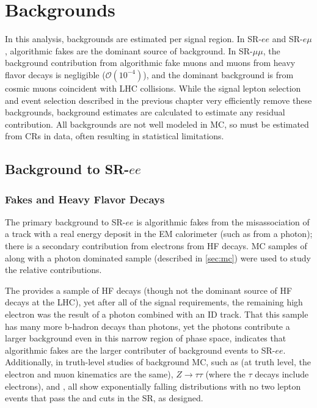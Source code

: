 \chapter{Backgrounds}
\label{chap:backgrounds}

In this analysis, backgrounds are estimated per signal region. In SR-$ee$ and SR-$e\mu$, algorithmic fakes are the dominant source of background. In SR-$\mu\mu$, the background contribution from algorithmic fake muons and muons from heavy flavor decays is negligible ($\mathcal{O}(10^{-4})$), and the dominant background is from cosmic muons coincident with \ac{LHC} collisions. While the signal lepton selection and event selection described in the previous chapter very efficiently remove these backgrounds, background estimates are calculated to estimate any residual contribution. All backgrounds are not well modeled in \ac{MC}, so must be estimated from \acp{CR} in data, often resulting in statistical limitations.

\section{Background to SR-$ee$}

\subsection{Fakes and Heavy Flavor Decays}

The primary background to SR-$ee$ is algorithmic fakes from the misassociation of a track with a real energy deposit in the \ac{EM} calorimeter (such as from a photon); there is a secondary contribution from electrons from \ac{HF} decays. \ac{MC} samples of \ttbar along with a photon dominated sample (described in \autoref{sec:mc}) were used to study the relative contributions. 

The \ttbar provides a sample of \ac{HF} decays (though not the dominant source of \ac{HF} decays at the \ac{LHC}), yet after all of the signal requirements, the remaining high \absdz electron was the result of a photon combined with an \ac{ID} track. That this sample has many more b-hadron decays than photons, yet the photons contribute a larger background even in this narrow region of phase space, indicates that algorithmic fakes are the larger contributer of background events to SR-$ee$. Additionally, in truth-level studies of background \ac{MC}, such as \bbmm (at truth level, the electron and muon kinematics are the same), $Z\rightarrow \tau\tau$ (where the $\tau$ decays include electrons), and \ttbar, all show exponentially falling distributions with no two lepton events that pass the \pt and \absdz cuts in the \ac{SR}, as designed. 

